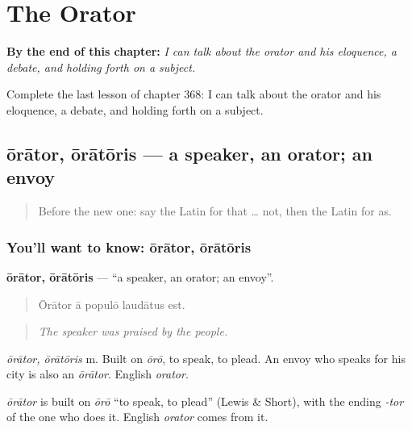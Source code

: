 
\chapter{The Orator}
\label{ch:la-the-orator}

\begin{chapteropening}
\textbf{By the end of this chapter:} \emph{I can talk about the orator and his eloquence, a debate, and holding forth on a subject.}

Complete the last lesson of chapter 368: I can talk about the orator and his eloquence, a debate, and holding forth on a subject.
\end{chapteropening}

\section[ōrātor, ōrātōris]{ōrātor, ōrātōris — a speaker, an orator; an envoy}

\label{lesson:LA-C368-orator}



\begin{quote}
Before the new one: say the Latin for that … not, then the Latin for as.
\end{quote}

\subsection*{You'll want to know: ōrātor, ōrātōris}
\textbf{ōrātor, ōrātōris} — \textquotedblleft{}a speaker, an orator; an envoy\textquotedblright{}.

\begin{quote}
Ōrātor ā populō laudātus est.
\end{quote}

\begin{quote}
\emph{The speaker was praised by the people.}
\end{quote}

\emph{ōrātor, ōrātōris} m. Built on \emph{ōrō}, to speak, to plead. An envoy who speaks for his city is also an \emph{ōrātor}. English \emph{orator}.

\begin{cousinweb}
\emph{ōrātor} is built on \emph{ōrō} \textquotedblleft{}to speak, to plead\textquotedblright{} (Lewis \& Short), with the ending \emph{-tor} of the one who does it. English \emph{orator} comes from it.
\end{cousinweb}


